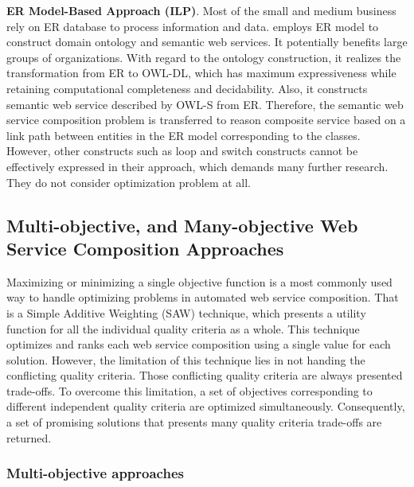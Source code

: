 \textbf{ER Model-Based Approach (ILP)}. Most of the small and medium business rely on ER database to process information and data. \cite{xu2010semantic} employs ER model to construct domain ontology and semantic web services.  It potentially benefits large groups of organizations. With regard to the ontology construction, it realizes the transformation from ER to OWL-DL, which has maximum expressiveness while retaining computational completeness and decidability. Also,  it constructs semantic web service described by OWL-S  from ER.  Therefore, the semantic web service composition problem is transferred to reason composite service based on a link path between entities in the ER model corresponding to the classes.  However, other constructs such as loop and switch constructs cannot be effectively expressed in their approach, which demands many further research. They do not consider optimization problem at all.

\subsection{Multi-objective, and Many-objective Web Service Composition Approaches}\label{multiobjective}
Maximizing or minimizing a single objective function is a most commonly used way to handle optimizing problems in automated web service composition.  That is a Simple Additive Weighting (SAW) \cite{hwang1981lecture} technique, which presents a utility function for all the individual quality criteria as a whole. This technique optimizes and ranks each web service composition using a single value for each solution. However,  the limitation of this technique lies in not handing the conflicting quality criteria.  Those conflicting quality criteria are always presented trade-offs. To overcome this limitation, a set of objectives corresponding to different independent quality criteria are optimized simultaneously. Consequently,  a set of promising solutions that presents many quality criteria trade-offs are returned.


\subsubsection{Multi-objective approaches}\label{MultiObjective}

